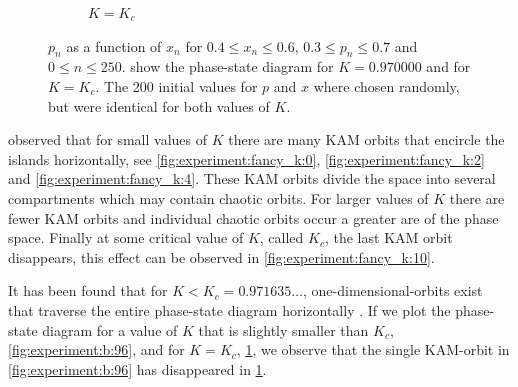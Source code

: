 \begin{figure}[t!]
\begin{subfigure}{\columnwidth}
		\caption{$K = K_c$}
		\label{fig:experiment:b:KC}
	\end{subfigure}	
	\caption{$p_n$ as a function of $x_n$ for $0.4 \leq x_n \leq 0.6$, $0.3 \leq p_n \leq 0.7$ and $0 \leq n \leq 250$.  show the phase-state diagram for $K = 0.970000$ and  for $K = K_c$. The 200 initial values for $p$ and $x$ where chosen randomly, but were identical for both values of $K$.}
	\label{fig:experiment:b:testKC}
\end{figure}

\citeauthor{greene1979method} observed that for small values of $K$ there are many KAM orbits that encircle the islands horizontally, see \cref{fig:experiment:fancy_k:0}, \ref{fig:experiment:fancy_k:2} and \ref{fig:experiment:fancy_k:4}. These KAM orbits divide the space into several compartments which may contain chaotic orbits. For larger values of $K$ there are fewer KAM orbits and individual chaotic orbits occur a greater are of the phase space. Finally at some critical value of $K$, called $K_c$, the last KAM orbit disappears, this effect can be observed in \cref{fig:experiment:fancy_k:10}. 

It has been found that for $K < K_c = 0.971635\dotsc$, one-dimensional-orbits exist that traverse the entire phase-state diagram horizontally \cite{kenzel1997physics}. If we plot the phase-state diagram for a value of $K$ that is slightly smaller than $K_c$, \cref{fig:experiment:b:96}, and for $K = K_c$, \cref{fig:experiment:b:KC}, we observe that the single KAM-orbit in \cref{fig:experiment:b:96} has disappeared in \cref{fig:experiment:b:KC}. 

